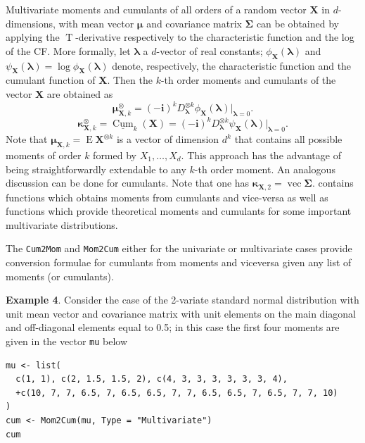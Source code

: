 Multivariate moments and cumulants of all orders of a random vector \(\mathbf{X}\) in \(d\)-dimensions, with mean vector \(\boldsymbol{\mu}\) and covariance matrix \(\mathbf{\Sigma}\) can be obtained by applying the \(\operatorname{T}\)-derivative respectively to the characteristic function and the log of the CF. More formally, let \(\boldsymbol{\lambda}\) a \(d\)-vector of real constants; \(\phi_{\mathbf{X}}(\boldsymbol{\lambda})\) and \(\psi_{\mathbf{X}}(\boldsymbol{\lambda})=\log\phi_{\mathbf{X}}(\boldsymbol{\lambda})\) denote, respectively, the characteristic function and the cumulant function of \(\mathbf{X}\). Then the \(k\)-th order moments and cumulants of the vector \(\mathbf{X}\) are obtained as
\[
\boldsymbol{\mu}^\otimes_{\mathbf{X},k} =   (-\mathbf{i})^k D_{\boldsymbol{\lambda}}^{\otimes k}{{\phi}%
}_{\mathbf{X}}(\boldsymbol{\lambda}) \big|_{\boldsymbol{\lambda}=0}.
\]
\[
\boldsymbol{\kappa}^\otimes_{\mathbf{X},k} =   \underline{\operatorname{Cum}}_k(\mathbf{X})= (-\mathbf{i})^k D_{\boldsymbol{\lambda}}^{\otimes k}{{\psi}%
}_{\mathbf{X}}(\boldsymbol{\lambda}) \big|_{\boldsymbol{\lambda}=0}.
\]
Note that \(\boldsymbol{\mu}_{\mathbf{X},k} = \operatorname{E}\mathbf{X}^{\otimes k}\) is a vector of dimension \(d^k\) that contains all possible moments of order \(k\) formed by \(X_1, \dots, X_d\). This approach has the advantage of being straightforwardly extendable to any \(k\)-th order moment. An analogous discussion can be done for cumulants. Note that one has \(\boldsymbol{\kappa}_{\mathbf{X},2} =\operatorname{vec} \mathbf{\Sigma}\).  contains functions which obtains moments from cumulants and vice-versa as well as functions which provide theoretical moments and cumulants for some important multivariate distributions.

The \texttt{Cum2Mom} and \texttt{Mom2Cum} either for the univariate or multivariate cases provide conversion formulae for cumulants from moments and viceversa given any list of moments (or cumulants).

\textbf{Example 4}. Consider the case of the 2-variate standard normal distribution with unit mean vector and covariance matrix with unit elements on the main diagonal and off-diagonal elements equal to 0.5; in this case the first four moments are given in the vector \texttt{mu} below

\begin{verbatim}
mu <- list(
  c(1, 1), c(2, 1.5, 1.5, 2), c(4, 3, 3, 3, 3, 3, 3, 4),
  +c(10, 7, 7, 6.5, 7, 6.5, 6.5, 7, 7, 6.5, 6.5, 7, 6.5, 7, 7, 10)
)
cum <- Mom2Cum(mu, Type = "Multivariate")
cum
\end{verbatim}

